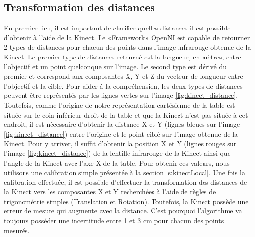 \subsection{Transformation des distances}
En premier lieu, il est important de clarifier quelles distances il est possible d'obtenir à l'aide de la Kinect. Le «Framework» OpenNI est capable de retourner 2 types de distances pour chacun des points dans l'image infrarouge obtenue de la Kinect. Le premier type de distances retourné est la longueur, en mètres, entre l'objectif et un point quelconque sur l'image. Le second type est dérivé du premier et correspond aux composantes X, Y et Z du vecteur de longueur entre l'objectif et la cible. Pour aider à la compréhension, les deux types de distances peuvent être représentés par les lignes vertes sur l'image \ref{fig:kinect_distance}. Toutefois, comme l'origine de notre représentation cartésienne de la table est située sur le coin inférieur droit de la table et que la Kinect n'est pas située à cet endroit, il est nécessaire d'obtenir la distance X et Y (lignes bleues sur l'image \ref{fig:kinect_distance}) entre l'origine et le point ciblé sur l'image obtenue de la Kinect. Pour y arriver, il suffit d'obtenir la position X et Y (lignes rouges sur l'image \ref{fig:kinect_distance}) de la lentille infrarouge de la Kinect ainsi que l'angle de la Kinect avec l'axe X de la table. Pour obtenir ces valeurs, nous utilisons une calibration simple présentée à la section \ref{s:kinectLocal}. Une fois la calibration effectuée, il est possible d'effectuer la transformation des distances de la Kinect vers les composantes X et Y recherchées à l'aide de règles de trigonométrie simples (Translation et Rotation). Toutefois, la Kinect possède une erreur de mesure qui augmente avec la distance. C'est pourquoi l'algorithme va toujours posséder une incertitude entre 1 et 3 cm pour chacun des points mesurés.

